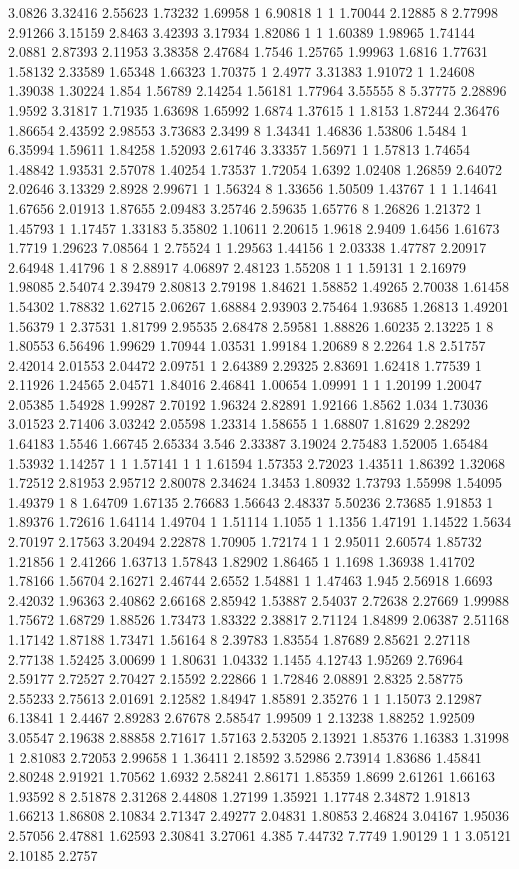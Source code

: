 3.0826 3.32416 2.55623 1.73232 1.69958 1 6.90818 1 1 1.70044 2.12885 8 2.77998 2.91266 3.15159 2.8463 3.42393 3.17934 1.82086 1 1 1.60389 1.98965 1.74144 2.0881 2.87393 2.11953 3.38358 2.47684 1.7546 1.25765 1.99963 1.6816 1.77631 1.58132 2.33589 1.65348 1.66323 1.70375 1 2.4977 3.31383 1.91072 1 1.24608 1.39038 1.30224 1.854 1.56789 2.14254 1.56181 1.77964 3.55555 8 5.37775 2.28896 1.9592 3.31817 1.71935 1.63698 1.65992 1.6874 1.37615 1 1.8153 1.87244 2.36476 1.86654 2.43592 2.98553 3.73683 2.3499 8 1.34341 1.46836 1.53806 1.5484 1 6.35994 1.59611 1.84258 1.52093 2.61746 3.33357 1.56971 1 1.57813 1.74654 1.48842 1.93531 2.57078 1.40254 1.73537 1.72054 1.6392 1.02408 1.26859 2.64072 2.02646 3.13329 2.8928 2.99671 1 1.56324 8 1.33656 1.50509 1.43767 1 1 1.14641 1.67656 2.01913 1.87655 2.09483 3.25746 2.59635 1.65776 8 1.26826 1.21372 1 1.45793 1 1.17457 1.33183 5.35802 1.10611 2.20615 1.9618 2.9409 1.6456 1.61673 1.7719 1.29623 7.08564 1 2.75524 1 1.29563 1.44156 1 2.03338 1.47787 2.20917 2.64948 1.41796 1 8 2.88917 4.06897 2.48123 1.55208 1 1 1.59131 1 2.16979 1.98085 2.54074 2.39479 2.80813 2.79198 1.84621 1.58852 1.49265 2.70038 1.61458 1.54302 1.78832 1.62715 2.06267 1.68884 2.93903 2.75464 1.93685 1.26813 1.49201 1.56379 1 2.37531 1.81799 2.95535 2.68478 2.59581 1.88826 1.60235 2.13225 1 8 1.80553 6.56496 1.99629 1.70944 1.03531 1.99184 1.20689 8 2.2264 1.8 2.51757 2.42014 2.01553 2.04472 2.09751 1 2.64389 2.29325 2.83691 1.62418 1.77539 1 2.11926 1.24565 2.04571 1.84016 2.46841 1.00654 1.09991 1 1 1.20199 1.20047 2.05385 1.54928 1.99287 2.70192 1.96324 2.82891 1.92166 1.8562 1.034 1.73036 3.01523 2.71406 3.03242 2.05598 1.23314 1.58655 1 1.68807 1.81629 2.28292 1.64183 1.5546 1.66745 2.65334 3.546 2.33387 3.19024 2.75483 1.52005 1.65484 1.53932 1.14257 1 1 1.57141 1 1 1.61594 1.57353 2.72023 1.43511 1.86392 1.32068 1.72512 2.81953 2.95712 2.80078 2.34624 1.3453 1.80932 1.73793 1.55998 1.54095 1.49379 1 8 1.64709 1.67135 2.76683 1.56643 2.48337 5.50236 2.73685 1.91853 1 1.89376 1.72616 1.64114 1.49704 1 1.51114 1.1055 1 1.1356 1.47191 1.14522 1.5634 2.70197 2.17563 3.20494 2.22878 1.70905 1.72174 1 1 2.95011 2.60574 1.85732 1.21856 1 2.41266 1.63713 1.57843 1.82902 1.86465 1 1.1698 1.36938 1.41702 1.78166 1.56704 2.16271 2.46744 2.6552 1.54881 1 1.47463 1.945 2.56918 1.6693 2.42032 1.96363 2.40862 2.66168 2.85942 1.53887 2.54037 2.72638 2.27669 1.99988 1.75672 1.68729 1.88526 1.73473 1.83322 2.38817 2.71124 1.84899 2.06387 2.51168 1.17142 1.87188 1.73471 1.56164 8 2.39783 1.83554 1.87689 2.85621 2.27118 2.77138 1.52425 3.00699 1 1.80631 1.04332 1.1455 4.12743 1.95269 2.76964 2.59177 2.72527 2.70427 2.15592 2.22866 1 1.72846 2.08891 2.8325 2.58775 2.55233 2.75613 2.01691 2.12582 1.84947 1.85891 2.35276 1 1 1.15073 2.12987 6.13841 1 2.4467 2.89283 2.67678 2.58547 1.99509 1 2.13238 1.88252 1.92509 3.05547 2.19638 2.88858 2.71617 1.57163 2.53205 2.13921 1.85376 1.16383 1.31998 1 2.81083 2.72053 2.99658 1 1.36411 2.18592 3.52986 2.73914 1.83686 1.45841 2.80248 2.91921 1.70562 1.6932 2.58241 2.86171 1.85359 1.8699 2.61261 1.66163 1.93592 8 2.51878 2.31268 2.44808 1.27199 1.35921 1.17748 2.34872 1.91813 1.66213 1.86808 2.10834 2.71347 2.49277 2.04831 1.80853 2.46824 3.04167 1.95036 2.57056 2.47881 1.62593 2.30841 3.27061 4.385 7.44732 7.7749 1.90129 1 1 3.05121 2.10185 2.2757 